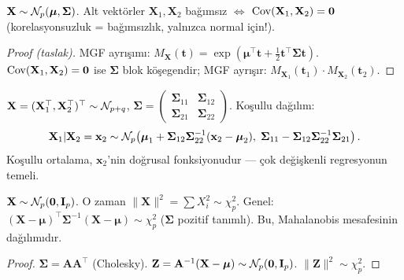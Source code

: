 \begin{teorem}\label{thm:cok_normal_bagimsiz}
$\mathbf{X}\sim\mathcal{N}_p(\boldsymbol\mu,\boldsymbol\Sigma)$. Alt vektörler $\mathbf{X}_1,\mathbf{X}_2$ bağımsız $\iff$ $\operatorname{Cov}(\mathbf{X}_1,\mathbf{X}_2)=\mathbf{0}$ (korelasyonsuzluk = bağımsızlık, yalnızca normal için!).
\end{teorem}

\begin{proof}[Proof (taslak)]
MGF ayrışımı: $M_\mathbf{X}(\mathbf{t})=\exp(\boldsymbol\mu^\top\mathbf{t}+\tfrac12\mathbf{t}^\top\boldsymbol\Sigma\mathbf{t})$. $\operatorname{Cov}(\mathbf{X}_1,\mathbf{X}_2)=\mathbf{0}$ ise $\boldsymbol\Sigma$ blok köşegendir; MGF ayrışır: $M_{\mathbf{X}_1}(\mathbf{t}_1)\cdot M_{\mathbf{X}_2}(\mathbf{t}_2)$.
\end{proof}

\begin{ornek}\label{ex:kosullu_normal}
$\mathbf{X}=(\mathbf{X}_1^\top,\mathbf{X}_2^\top)^\top\sim\mathcal{N}_{p+q}$, $\boldsymbol\Sigma=\begin{pmatrix}\boldsymbol\Sigma_{11}&\boldsymbol\Sigma_{12}\\\boldsymbol\Sigma_{21}&\boldsymbol\Sigma_{22}\end{pmatrix}$. Koşullu dağılım:
\[
  \mathbf{X}_1|\mathbf{X}_2=\mathbf{x}_2\sim\mathcal{N}_p\!\left(\boldsymbol\mu_1+\boldsymbol\Sigma_{12}\boldsymbol\Sigma_{22}^{-1}(\mathbf{x}_2-\boldsymbol\mu_2),\;\boldsymbol\Sigma_{11}-\boldsymbol\Sigma_{12}\boldsymbol\Sigma_{22}^{-1}\boldsymbol\Sigma_{21}\right).
\]
Koşullu ortalama, $\mathbf{x}_2$'nin doğrusal fonksiyonudur --- çok değişkenli regresyonun temeli.
\end{ornek}

\begin{teorem}\label{thm:kare_dagilimlari}
$\mathbf{X}\sim\mathcal{N}_p(\mathbf{0},\mathbf{I}_p)$. O zaman $\|\mathbf{X}\|^2=\sum X_i^2\sim\chi^2_p$.
Genel: $(\mathbf{X}-\boldsymbol\mu)^\top\boldsymbol\Sigma^{-1}(\mathbf{X}-\boldsymbol\mu)\sim\chi^2_p$ ($\boldsymbol\Sigma$ pozitif tanımlı).
Bu, Mahalanobis mesafesinin dağılımıdır.
\end{teorem}

\begin{proof}
$\boldsymbol\Sigma=\mathbf{A}\mathbf{A}^\top$ (Cholesky). $\mathbf{Z}=\mathbf{A}^{-1}(\mathbf{X}-\boldsymbol\mu)\sim\mathcal{N}_p(\mathbf{0},\mathbf{I}_p)$. $\|\mathbf{Z}\|^2\sim\chi^2_p$.
\end{proof}

